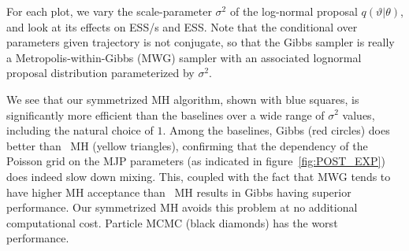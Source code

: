   For each plot, we vary the scale-parameter $\sigma^2$ of the log-normal proposal $q(\vartheta|\theta)$, and look at its effects on ESS/s and ESS. 
  Note that the conditional over parameters given trajectory is not conjugate, so that the Gibbs sampler is really a Metropolis-within-Gibbs (MWG) sampler with an associated lognormal proposal distribution parameterized by $\sigma^2$.

  We see that our symmetrized MH algorithm, shown with blue squares, is significantly more efficient than the baselines over a wide range of $\sigma^2$ values, including the natural choice of $1$.
  Among the baselines, Gibbs (red circles) does better than \naive\ MH (yellow triangles), confirming that the dependency of the Poisson grid on the MJP parameters (as indicated in figure~\ref{fig:POST_EXP}) does indeed slow down mixing. 
 This, coupled with the fact that MWG tends to have higher MH acceptance than \naive\ MH results in Gibbs having superior performance. 
  Our symmetrized MH avoids this problem at no additional computational cost.
  Particle MCMC (black diamonds) has the worst performance. 

